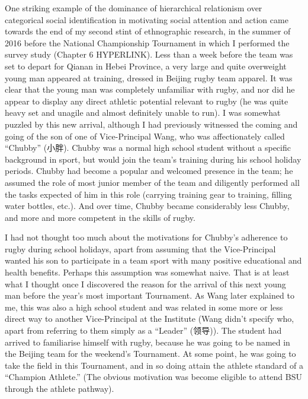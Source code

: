 \begin{CJK}{UTF8}{gbsn}
  One striking example of the dominance of hierarchical relationism over categorical social identification in motivating social attention and action came towards the end of my second stint of ethnographic research, in the summer of 2016 before the National Championship Tournament in which I performed the survey study (Chapter 6 HYPERLINK).  Less than a week before the team was set to depart for Qianan in Hebei Province, a very large and quite overweight young man appeared at training, dressed in Beijing rugby team apparel.  It was clear that the young man was completely unfamiliar with rugby, and nor did he appear to display any direct athletic potential relevant to rugby (he was quite heavy set and unagile and almost definitely unable to run).  I was somewhat puzzled by this new arrival, although I had previously witnessed the coming and going of the son of one of Vice-Principal Wang, who was affectionately called ``Chubby'' (小胖).
  Chubby was a normal high school student without a specific background in sport, but would join the team's training during his school holiday periods.  Chubby had become a popular and welcomed presence in the team; he assumed the role of most junior member of the team and diligently performed all the tasks expected of him in this role (carrying training gear to training, filling water bottles, etc.).  And over time, Chubby became considerably less Chubby, and more and more competent in the skills of rugby.

  I had not thought too much about the motivations for Chubby's adherence to rugby during school holidays, apart from assuming that the Vice-Principal wanted his son to participate in a team sport with many positive educational and health benefits.  Perhaps this assumption was somewhat naive.  That is at least what I thought once I discovered the reason for the arrival of this next young man before the year's most important Tournament.  As Wang later explained to me, this was also a high school student and was related in some more or less direct way to another Vice-Principal at the Institute (Wang didn't specify who, apart from referring to them simply as a ``Leader'' (领导)).  The student had arrived to familiarise himself with rugby, because he was going to be named in the Beijing team for the weekend's Tournament.  At some point, he was going to take the field in this Tournament, and in so doing attain the athlete standard of a ``Champion Athlete.''  (The obvious motivation was become eligible to attend BSU through the athlete pathway).


\end{CJK}
